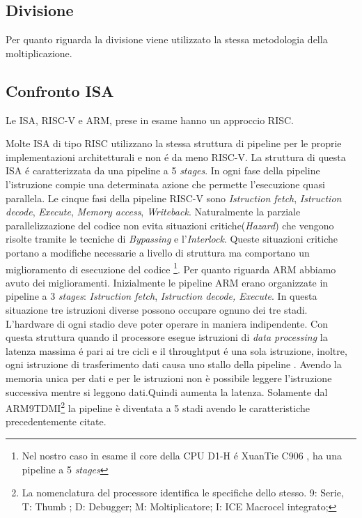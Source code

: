 \documentclass[12pt, a4paper]{report}
\begin{document}
\vspace{2cm}

\subsection{Divisione}
Per quanto riguarda la divisione viene utilizzato la stessa metodologia della moltiplicazione.

\subsection{Confronto ISA}
Le ISA, RISC-V e ARM, prese in esame hanno un approccio RISC. 

Molte ISA di tipo RISC utilizzano la stessa struttura di pipeline per le proprie implementazioni architetturali e non \'e da meno RISC-V. La struttura di questa ISA \'e caratterizzata da una pipeline a 5 \textit{stages}. In ogni fase della pipeline l'istruzione compie una determinata azione che permette l'esecuzione quasi parallela. %
Le cinque fasi della pipeline RISC-V sono \textit{Istruction fetch}, \textit{Istruction decode}, \textit{Execute}, \textit{Memory access}, \textit{Writeback}. %
Naturalmente la parziale parallelizzazione del codice non evita situazioni critiche(\textit{Hazard}) che vengono risolte tramite le tecniche di \textit{Bypassing} e l'\textit{Interlock}. Queste situazioni critiche portano a modifiche necessarie a livello di struttura ma comportano un miglioramento di esecuzione del codice \footnote{Nel nostro caso in esame il core della CPU D1-H \'e XuanTie C906 \cite{DocH1}, ha una pipeline a 5 \textit{stages}}. 
Per quanto riguarda ARM abbiamo avuto dei miglioramenti.  Inizialmente le pipeline ARM erano organizzate in pipeline a 3 \textit{stages}: \textit{Istruction fetch}, \textit{Istruction decode, Execute}. In questa situazione tre istruzioni diverse possono occupare ognuno dei tre stadi. L’hardware di ogni stadio deve poter operare in maniera indipendente. Con questa struttura quando il processore esegue istruzioni di \textit{data processing} la latenza massima \'e pari ai tre cicli e il throughtput \'e una sola istruzione, inoltre, ogni istruzione di trasferimento dati causa uno stallo della pipeline \cite{3stagesPipeline}. Avendo la memoria unica per dati e per le istruzioni non è possibile leggere l’istruzione successiva mentre si leggono dati.Quindi aumenta la latenza. Solamente dal ARM9TDMI\footnote{La nomenclatura del processore identifica le specifiche dello stesso. 9: Serie, T: Thumb ; D: Debugger; M: Moltiplicatore; I: ICE Macrocel integrato;} la pipeline è diventata a 5 stadi avendo le caratteristiche precedentemente citate.
\end{document}
